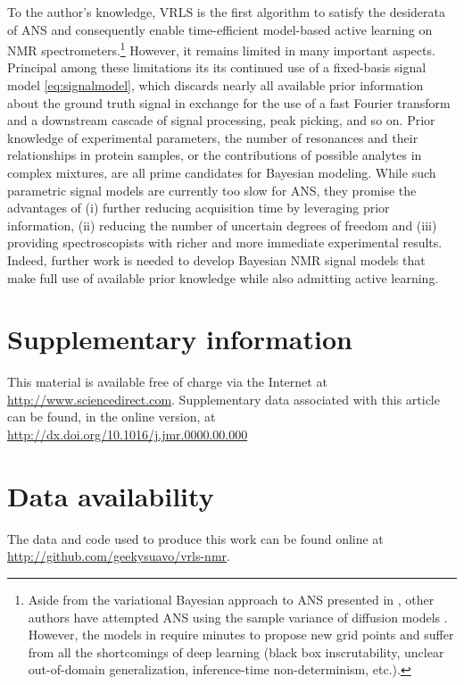 \documentclass[final,5p,times,twocolumn]{elsarticle}
\begin{document}
To the author's knowledge, VRLS is the first algorithm to satisfy the
desiderata of ANS and consequently enable time-efficient model-based
active learning on NMR spectrometers.\footnote{%
 Aside from the variational Bayesian approach to ANS presented in
 \cite{worley:cmr2018}, other authors have attempted ANS using the
 sample variance of diffusion models \cite{goffinet:arxiv2025}.
 However, the models in \cite{goffinet:arxiv2025} require minutes to
 propose new grid points and suffer from all the shortcomings of deep
 learning (black box inscrutability, unclear out-of-domain generalization,
 inference-time non-determinism, etc.).
} However, it remains limited in
many important aspects. Principal among these limitations its its continued
use of a fixed-basis signal model \eqref{eq:signalmodel}, which discards
nearly all available prior information about the ground truth signal in
exchange for the use of a fast Fourier transform and a downstream cascade
of signal processing, peak picking, and so on. Prior knowledge of
experimental parameters, the number of resonances and their relationships
in protein samples, or the contributions of possible analytes in complex
mixtures, are all prime candidates for Bayesian modeling. While such
parametric signal models are currently too slow for ANS, they promise
the advantages of (i) further reducing acquisition time by leveraging
prior information, (ii) reducing the number of uncertain degrees of freedom
and (iii) providing spectroscopists with richer and more immediate
experimental results. Indeed, further work is needed to develop Bayesian
NMR signal models that make full use of available prior knowledge while
also admitting active learning.

\appendix
\section{Supplementary information}
\label{app:si}
This material is available free of charge via the Internet at
\url{http://www.sciencedirect.com}. Supplementary data associated
with this article can be found, in the online version, at
\url{http://dx.doi.org/10.1016/j.jmr.0000.00.000}

\section*{Data availability}
\label{app:data}
The data and code used to produce this work can be found online at
\url{http://github.com/geekysuavo/vrls-nmr}.



\end{document}
